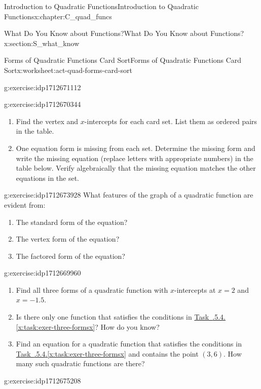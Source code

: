 \documentclass[oneside,10pt,]{book}
\newcommand{\xreffont}{\relax}
\numberwithin{equation}{chapter}
\begin{document}
\begin{chapterptx}{Introduction to Quadratic Functions}{}{Introduction to Quadratic Functions}{}{}{x:chapter:C_quad_funcs}
\begin{sectionptx}{What Do You Know about Functions?}{}{What Do You Know about Functions?}{}{}{x:section:S_what_know}
\begin{worksheet-subsection}{Forms of Quadratic Functions Card Sort}{}{Forms of Quadratic Functions Card Sort}{}{}{x:worksheet:act-quad-forms-card-sort}
\begin{divisionexercise}{1}{}{}{g:exercise:idp1712671112}
\begin{enumerate}[font=\bfseries,label=(\alph*),ref=\alph*]
\end{enumerate}
\end{divisionexercise}%
\begin{divisionexercise}{2}{}{}{g:exercise:idp1712670344}%
\begin{enumerate}[font=\bfseries,label=(\alph*),ref=\alph*]
\item{}Find the vertex and \(x\)-intercepts for each card set. List them as ordered pairs in the table.%
\item{}One equation form is missing from each set. Determine the missing form and write the missing equation (replace letters with appropriate numbers) in the table below. Verify algebraically that the missing equation matches the other equations in the set.%
\end{enumerate}
\end{divisionexercise}%
\begin{divisionexercise}{3}{}{}{g:exercise:idp1712673928}%
What features of the graph of a quadratic function are evident from:%
\begin{enumerate}[font=\bfseries,label=(\alph*),ref=\alph*]
\item{}The standard form of the equation?%
\item{}The vertex form of the equation?%
\item{}The factored form of the equation?%
\end{enumerate}
\end{divisionexercise}%
\begin{divisionexercise}{4}{}{}{g:exercise:idp1712669960}%
\begin{enumerate}[font=\bfseries,label=(\alph*),ref=\alph*]
\item\label{x:task:exer-three-formsx}Find all three forms of a quadratic function with \(x\)-intercepts at \(x = 2\) and \(x = -1.5\).%
\item{}Is there only one function that satisfies the conditions in \hyperref[x:task:exer-three-formsx]{Task~{\xreffont 4.6.5.4}.{\xreffont\ref{x:task:exer-three-formsx}}}? How do you know?%
\item{}Find an equation for a quadratic function that satisfies the conditions in \hyperref[x:task:exer-three-formsx]{Task~{\xreffont 4.6.5.4}.{\xreffont\ref{x:task:exer-three-formsx}}} and contains the point \((3, 6)\). How many such quadratic functions are there?%
\end{enumerate}
\end{divisionexercise}%
\begin{divisionexercise}{5}{}{}{g:exercise:idp1712675208}%

\end{divisionexercise}
\end{worksheet-subsection}
\end{sectionptx}
\end{chapterptx}
\end{document}
